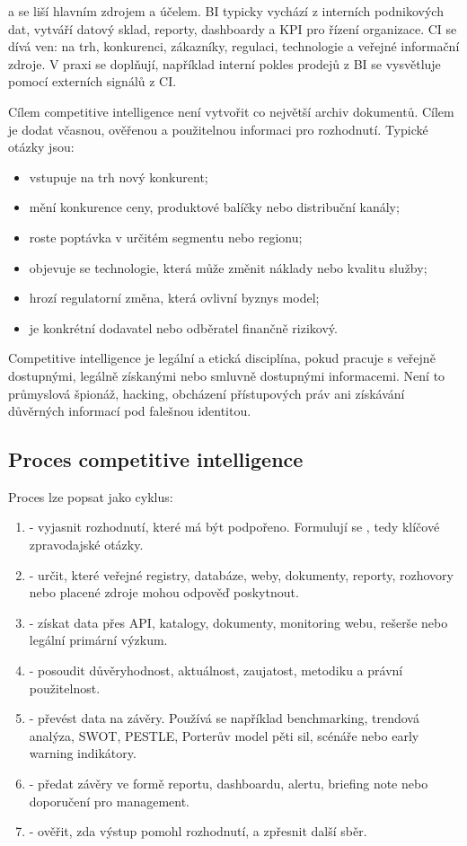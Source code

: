  a  se liší hlavním zdrojem a účelem.
BI typicky vychází z interních podnikových dat, vytváří datový sklad, reporty, dashboardy a KPI pro
řízení organizace. CI se dívá ven: na trh, konkurenci, zákazníky, regulaci, technologie a veřejné
informační zdroje. V praxi se doplňují, například interní pokles prodejů z BI se vysvětluje pomocí
externích signálů z CI.

Cílem competitive intelligence není vytvořit co největší archiv dokumentů. Cílem je dodat včasnou,
ověřenou a použitelnou informaci pro rozhodnutí. Typické otázky jsou:
\begin{itemize}
  \item vstupuje na trh nový konkurent;
  \item mění konkurence ceny, produktové balíčky nebo distribuční kanály;
  \item roste poptávka v určitém segmentu nebo regionu;
  \item objevuje se technologie, která může změnit náklady nebo kvalitu služby;
  \item hrozí regulatorní změna, která ovlivní byznys model;
  \item je konkrétní dodavatel nebo odběratel finančně rizikový.
\end{itemize}

Competitive intelligence je legální a etická disciplína, pokud pracuje s veřejně dostupnými,
legálně získanými nebo smluvně dostupnými informacemi. Není to průmyslová špionáž, hacking,
obcházení přístupových práv ani získávání důvěrných informací pod falešnou identitou.

\subsection{Proces competitive intelligence}
Proces lze popsat jako cyklus:
\begin{enumerate}
  \item {} - vyjasnit rozhodnutí, které má být podpořeno. Formulují se
  , tedy klíčové zpravodajské otázky.
  \item {} - určit, které veřejné registry, databáze, weby, dokumenty, reporty,
  rozhovory nebo placené zdroje mohou odpověď poskytnout.
  \item {} - získat data přes API, katalogy, dokumenty, monitoring webu,
  rešerše nebo legální primární výzkum.
  \item {} - posoudit důvěryhodnost, aktuálnost, zaujatost, metodiku a právní
  použitelnost.
  \item {} - převést data na závěry. Používá se například benchmarking, trendová analýza,
  SWOT, PESTLE, Porterův model pěti sil, scénáře nebo early warning indikátory.
  \item {} - předat závěry ve formě reportu, dashboardu, alertu, briefing note nebo
  doporučení pro management.
  \item {} - ověřit, zda výstup pomohl rozhodnutí, a zpřesnit další sběr.
\end{enumerate}

